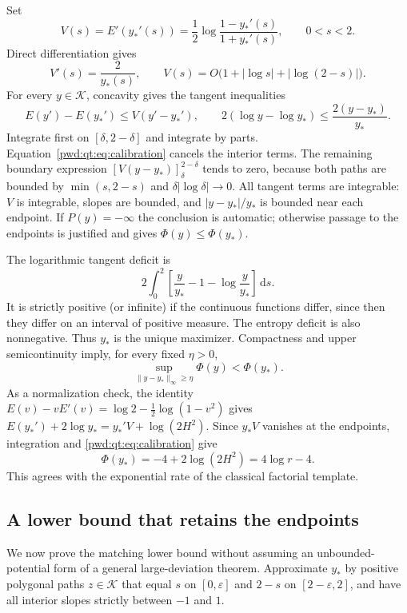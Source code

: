 \documentclass[11pt,letterpaper]{article}
\numberwithin{equation}{section}
\theoremstyle{remark}\newtheorem{remark}[theorem]{Remark}
\newcommand{\K}{\mathcal K}\newcommand{\ee}{\mathrm e}\newcommand{\dd}{\,\mathrm d}
\begin{document}
Set
\[
 V(s)=E'(y_*'(s))=\frac12\log\frac{1-y_*'(s)}{1+y_*'(s)},\qquad0<s<2.
\]
Direct differentiation gives
\begin{equation}\label{pwd:qt:eq:calibration}
 V'(s)=\frac2{y_*(s)},\qquad
 V(s)=O\bigl(1+|\log s|+|\log(2-s)|\bigr).
\end{equation}
For every $y\in\K$, concavity gives the tangent inequalities
\[
 E(y')-E(y_*')\le V(y'-y_*'),\qquad
 2(\log y-\log y_*)\le\frac{2(y-y_*)}{y_*}.
\]
Integrate first on $[\delta,2-\delta]$ and integrate by parts. Equation~\eqref{pwd:qt:eq:calibration} cancels the interior terms. The remaining boundary expression
$[V(y-y_*)]_{\delta}^{2-\delta}$ tends to zero, because both paths are bounded by $\min(s,2-s)$ and $\delta|\log\delta|\to0$. All tangent terms are integrable: $V$ is integrable, slopes are bounded, and $|y-y_*|/y_*$ is bounded near each endpoint. If $P(y)=-\infty$ the conclusion is automatic; otherwise passage to the endpoints is justified and gives $\Phi(y)\le\Phi(y_*)$.

The logarithmic tangent deficit is
\[
 2\int_0^2\left[\frac{y}{y_*}-1-\log\frac{y}{y_*}\right]\dd s.
\]
It is strictly positive (or infinite) if the continuous functions differ, since then they differ on an interval of positive measure. The entropy deficit is also nonnegative. Thus $y_*$ is the unique maximizer. Compactness and upper semicontinuity imply, for every fixed $\eta>0$,
\begin{equation}\label{pwd:qt:eq:gap}
 \sup_{\|y-y_*\|_\infty\ge\eta}\Phi(y)<\Phi(y_*).
\end{equation}
As a normalization check, the identity
$E(v)-vE'(v)=\log2-\tfrac12\log(1-v^2)$ gives
$E(y_*')+2\log y_*=y_*'V+\log(2H^2)$. Since $y_*V$ vanishes at the endpoints, integration and \eqref{pwd:qt:eq:calibration} give
\begin{equation}\label{pwd:qt:eq:phi-value}
 \Phi(y_*)=-4+2\log(2H^2)=4\log r-4.
\end{equation}
This agrees with the exponential rate of the classical factorial template.

\subsection{A lower bound that retains the endpoints}
We now prove the matching lower bound without assuming an unbounded-potential form of a general large-deviation theorem. Approximate $y_*$ by positive polygonal paths $z\in\K$ that equal $s$ on $[0,\varepsilon]$ and $2-s$ on $[2-\varepsilon,2]$, and have all interior slopes strictly between $-1$ and $1$.
\end{document}
